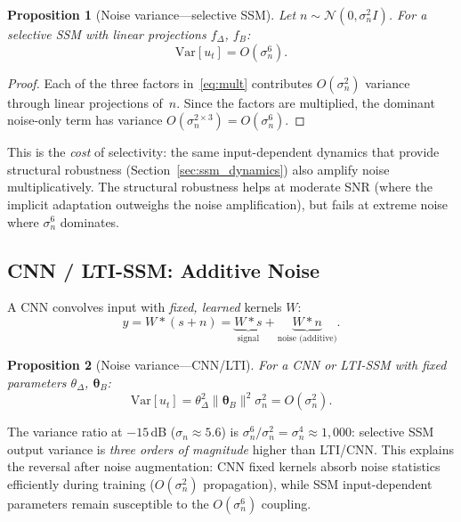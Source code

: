 \documentclass[journal]{IEEEtran}
\newtheorem{proposition}{Proposition}
\begin{document}
\begin{proposition}[Noise variance---selective SSM]
\label{prop:var_ssm}
Let $n \sim \mathcal{N}(0, \sigma_n^2 I)$. For a selective SSM with linear projections $f_\Delta$, $f_B$:
\begin{equation}
\mathrm{Var}[u_t] = O(\sigma_n^6).
\label{eq:var_ssm}
\end{equation}
\end{proposition}
\begin{proof}
Each of the three factors in~\eqref{eq:mult} contributes $O(\sigma_n^2)$ variance through linear projections of~$n$. Since the factors are multiplied, the dominant noise-only term has variance $O(\sigma_n^{2 \times 3}) = O(\sigma_n^6)$.
\end{proof}

This is the \emph{cost} of selectivity: the same input-dependent dynamics that provide structural robustness (Section~\ref{sec:ssm_dynamics}) also amplify noise multiplicatively.
The structural robustness helps at moderate SNR (where the implicit adaptation outweighs the noise amplification), but fails at extreme noise where $\sigma_n^6$ dominates.

\subsection{CNN / LTI-SSM: Additive Noise}
\label{sec:add_noise}

A CNN convolves input with \emph{fixed, learned} kernels $W$:
\begin{equation}
y = W \ast (s + n) = \underbrace{W \ast s}_{\text{signal}} + \underbrace{W \ast n}_{\text{noise (additive)}}.
\label{eq:cnn}
\end{equation}

\begin{proposition}[Noise variance---CNN/LTI]
\label{prop:var_cnn}
For a CNN or LTI-SSM with fixed parameters $\theta_\Delta$, $\bm{\theta}_B$:
\begin{equation}
\mathrm{Var}[u_t] = \theta_\Delta^2 \lVert\bm{\theta}_B\rVert^2 \sigma_n^2 = O(\sigma_n^2).
\label{eq:var_cnn}
\end{equation}
\end{proposition}

\smallskip
The variance ratio at $-15$\,dB ($\sigma_n \approx 5.6$) is $\sigma_n^6 / \sigma_n^2 = \sigma_n^4 \approx 1{,}000$: selective SSM output variance is \emph{three orders of magnitude} higher than LTI/CNN.
This explains the reversal after noise augmentation: CNN fixed kernels absorb noise statistics efficiently during training ($O(\sigma_n^2)$ propagation), while SSM input-dependent parameters remain susceptible to the $O(\sigma_n^6)$ coupling.
\end{document}
